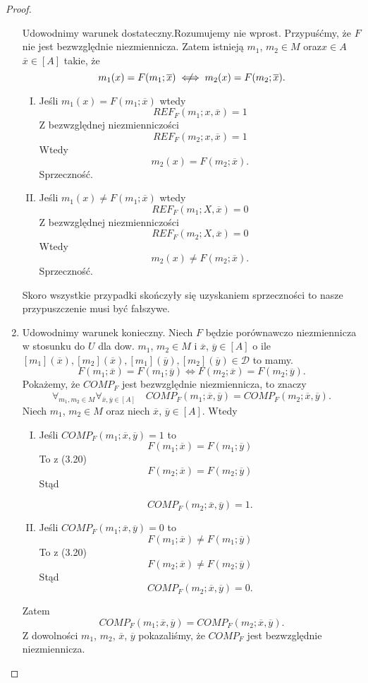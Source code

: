 \documentclass[12pt,a4paper]{report}
\newcommand{\domkniecie}[1]{\left[ {#1} \right] }
\newcommand{\notiff}{%
  \mathrel{{\ooalign{\hidewidth$\not\phantom{"}$\hidewidth\cr$\iff$}}}}
\begin{document}
\begin{proof}
\begin{enumerate}
Udowodnimy warunek dostateczny.Rozumujemy nie wprost. Przypuśćmy, że $F$ nie jest bezwzględnie niezmiennicza. Zatem istnieją $m_1$, $m_2 \in M$ oraz$x\in A$ $\overline{x} \in \domkniecie{A}$ takie, że
$$
m_{1}(x)=F(m_{1};\overline{x}) \notiff m_{2}(x)=F(m_{2};\overline{x}).
$$
\begin{enumerate}[I.]
\item
Jeśli $m_1(x)=F(m_1;\overline{x})$ wtedy 
$$
REF_{F}(m_1;x,\overline{x})=1
$$
Z bezwzględnej niezmienniczości
 $$
 REF_{F}(m_2;x,\overline{x})=1
 $$
Wtedy
$$
m_2(x)=F(m_2;\overline{x}).
$$
Sprzeczność.
\item
Jeśli $m_1(x)\ne F(m_1;\overline{x})$ wtedy 
$$
REF_{F}(m_1;X,\overline{x})=0
$$
Z bezwzględnej niezmienniczości 
$$
REF_{F}(m_2;X,\overline{x})=0
$$ 
Wtedy
$$
m_2(x)\ne F(m_2;\overline{x}).
$$
 Sprzeczność.
\end{enumerate}
Skoro wszystkie przypadki skończyły się uzyskaniem sprzeczności to nasze przypuszczenie musi być fałszywe.
\item 
Udowodnimy warunek konieczny. Niech $F$ będzie porównawczo niezmiennicza w stosunku do $U$ 
dla dow. $m_1$, $m_2 \in M$ i $\overline{x}$, $\overline{y} \in \domkniecie{A}$ o ile $\domkniecie{m_1}(\overline{x}), \domkniecie{ m_2}(\overline{x}), \domkniecie{m_1}(\overline{y}), \domkniecie{m_2}(\overline{y}) \in \mathcal{D}$ to mamy.
\begin{equation}
F(m_{1};\overline{x})=F(m_{1};\overline{y}) \iff F(m_{2};\overline{x})=F(m_{2};\overline{y}).
\end{equation}
Pokażemy, że $COMP_{F}$ jest bezwzględnie niezmiennicza, to znaczy
\begin{equation}
\forall_{m_1, m_2 \in M} \forall_{\overline{x}, \overline{y}\in \domkniecie{A}} \quad COMP_{F}(m_1;\overline{x},\overline{y})=COMP_{F}(m_2;\overline{x},\overline{y}).
\end{equation}
 Niech $m_1$, $m_2 \in M$ oraz niech $\overline{x}$, $\overline{y} \in \domkniecie{A}$. Wtedy
\begin{enumerate}[I.]
\item
Jeśli $COMP_{F}(m_1;\overline{x},\overline{y})=1$ to
$$
F(m_1;\overline{x})=F(m_1;\overline{y})
$$
To z (3.20) 
$$
F(m_2;\overline{x})=F(m_2;\overline{y})
$$
Stąd 

$$
COMP_{F}(m_2;\overline{x},\overline{y})=1.
$$
\item
Jeśli $COMP_{F}(m_1;\overline{x},\overline{y})=0$ to 
$$
F(m_1;\overline{x})\ne F(m_1;\overline{y})
$$
To z (3.20) 
$$
F(m_2;\overline{x})\ne F(m_2;\overline{y})
$$
Stąd 
$$
COMP_{F}(m_2;\overline{x},\overline{y})=0.
$$
\end{enumerate}
Zatem 
$$
COMP_{F}(m_1;\overline{x},\overline{y})=COMP_{F}(m_2;\overline{x},\overline{y}).
$$
Z dowolności $m_1$, $m_2$, $\overline{x}$, $\overline{y}$ pokazaliśmy, że $COMP_{F}$ jest bezwzględnie niezmiennicza.


\end{enumerate}
\end{proof}
\end{document}
